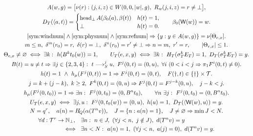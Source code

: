 \begin{gather}
A(w,g)=\bigl[\nu(r):(j,i,z)\in W(0,0,|w|,g),\ R_w(j,i,z)=r\ne\bot\bigr],\\
D_T(\pair a t)=
 \begin{cases}\operatorname{head}_{\bot} A(\beta_0(a),\beta(t))&h(t)=1,\\ \bot&h(t)=0.\end{cases}
 \qquad \beta_0(\wt(w))=w.\\
\eqref{sym:windnum}\land\eqref{sym:physnum}\land\eqref{sym:refnum}
\Rightarrow \{y:y\in A(w,g)\}=\nu[\Theta_{e,x}].\\
m\le n,\ \delta^m(r_0)=r,\ \delta(r)=\bot,\
\delta^n(r_0)=r'\ne\bot
 \Rightarrow n=m,\ r'=r,\qquad |\Theta_{e,x}|\le1.\\
\Theta_{e,x}\ne\varnothing\iff\exists k:\ h(B^kt_0(w))=1,\qquad
U_T(e,x,y)\iff\exists k:\ H_T(\sigma_T^kE_T)=1,\ D_T(\sigma_T^kE_T)=y.\label{sym:numerical}\\
B(t)=u\ne t\Rightarrow\exists j\in\{2,3,4\}:\
 t\R^j u,\ F^j(0,t)=(0,u),\ \forall i\ (0<i<j\Rightarrow\pi_1F^i(0,t)\ne0).\\
h(t)=1\ \land\ h_\mu(F^j(0,t))=1\Rightarrow F^j(0,t)=(0,t),\quad
F(\dagger,t)\in\{\dagger\}\times\T.\\
j=k+(j-k),\ k\ge2,\ F^k(0,t)=(0,u)
 \Rightarrow F^j(0,t)=F^{j-k}(0,u),\quad j-k<j.\\
h_\mu(F^j(0,t_0))=1\Rightarrow\exists n:\ F^j(0,t_0)=(0,B^nt_0),\qquad
\forall n\ \exists j:\ F^j(0,t_0)=(0,B^nt_0).\\
 U_T(e,x,y)\iff\exists j,u:\ F^j(0,t_0(w))=(0,u),\
 h(u)=1,\ D_T(\pair{\wt(w)}u)=y.\\
N=q^r,\quad a(n)=H_{\!Q}(\alpha(T^n v)),\quad
 J=\{n:a(n)=1\},\quad J\ne\varnothing\Rightarrow \min J<N.\\
\begin{aligned}
\forall d:\T^r\to\mathbb N_\bot,\quad
 &\exists n:\ n\in J,\ (\forall j<n,\ j\notin J),\ d(T^n v)=y\\
\iff{}\ &\exists n<N:\ a(n)=1,\ (\forall j<n,\ a(j)=0),\ d(T^n v)=y .
\end{aligned}
\end{gather}
